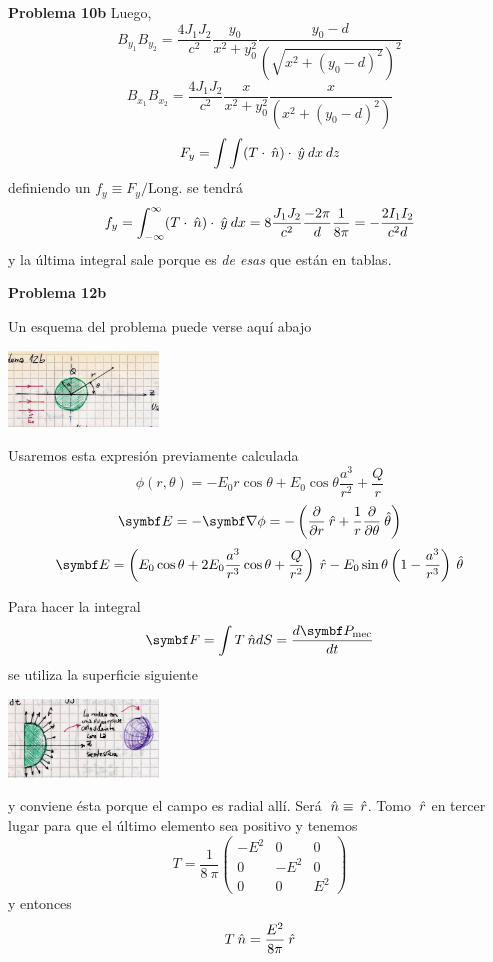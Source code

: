 \documentclass[10pt,oneside]{CBFT_book}
\begin{document}
\begin{ejemplo}{\bf Problema 10b}
Luego,
\[
	B_{y_1} B_{y_2} = \frac{4 J_1 J_2}{c^2} \frac{y_0}{x^2 + y_0^2} 
	\frac{y_0-d}{(\sqrt{x^2+ (y_0-d)^2})^2}
\]
\[
	B_{x_1} B_{x_2} = \frac{4 J_1 J_2}{c^2} 
	\frac{x}{x^2 + y_0^2} \frac{x}{(x^2+ (y_0-d)^2)}
\]
\[
	F_y = \int\int (T\cdot\:\hat{n})\cdot\:\hat{y} \: dx \: dz
\]
definiendo un $f_y \equiv F_y/\text{Long.}$ se tendrá
\[
	f_y = \int_{-\infty}^\infty (T\cdot\:\hat{n})\cdot\:\hat{y} \: dx =
	8 \frac{J_1 J_2}{c^2} \frac{-2\pi}{d} \frac{1}{8\pi} = - \frac{2I_1I_2}{c^2 d}
\]
y la última integral sale porque es {\it de esas} que están en tablas.
 
\end{ejemplo}

\begin{ejemplo}{\bf Problema 12b}

Un esquema del problema puede verse aquí abajo

\includegraphics[width=0.3\textwidth]{images/fig_ft1_problema12bA.jpg}

Usaremos esta expresión previamente calculada
\[
	\phi(r,\theta) = - E_0 r \cos\theta + 
	E_0 \cos\theta \frac{a^3}{r^2} + \frac{Q}{r}
\]
\[
	\vb{E} = - \Nabla\phi = - \left( \dpar{}{r}\rver + 
	\frac{1}{r}\dpar{}{\theta}\thetaver \right)
\]
\[
	\vb{E} = \left( E_0 \cos\theta + 2 E_0 \frac{a^3}{r^3} \cos\theta + 
	\frac{Q}{r^2} \right) \rver
	- E_0 \sin\theta \left( 1 - \frac{a^3}{r^3} \right) \thetaver
\]

Para hacer la integral 
\[
	\vb{F} = \int T \nver dS = \dtot{\vb{P}_\text{mec}}{t}
\]
se utiliza la superficie siguiente

\includegraphics[width=0.3\textwidth]{images/fig_ft1_problema12bB.jpg}
 
y conviene ésta porque el campo es radial allí. Será $\:\hat{n} \equiv \:\hat{r}$.
Tomo $\:\hat{r}$ en tercer lugar para que el último elemento sea positivo y tenemos
\[
	T = \frac{1}{8\:\pi}\begin{pmatrix}
	        -E^2  & 0 & 0 \\
		0 & -E^2 & 0 \\
		0	& 0	& E^2
	       \end{pmatrix}		
\]
y entonces
\[
	T\:\hat{n} = \frac{E^2}{8\pi}\:\hat{r}
\]


\end{ejemplo}
\end{document}
